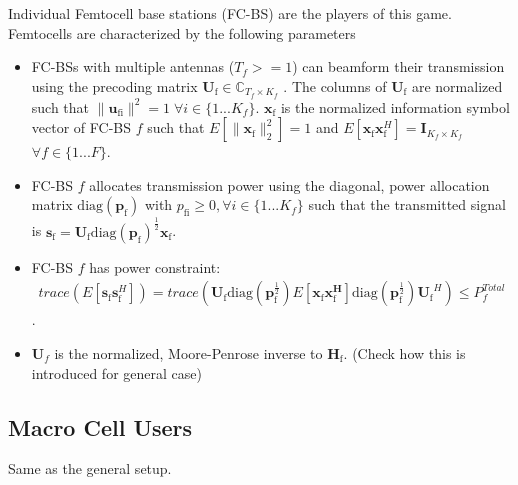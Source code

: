 \documentclass[12pt,a4paper]{report}
\begin{document}
Individual Femtocell base stations (FC-BS) are the players of this game.
\\
Femtocells are characterized by the following parameters
\begin{itemize}
\item 
	FC-BSs with multiple antennas ($T_f >=1$) can beamform their transmission using the precoding 	
	matrix $\mathbf{U}_{\mathrm{f}} \in \mathbb{C}_{T_f \times K_f}$ .
	The columns of $\mathbf{U}_{\mathrm{f}}$ are normalized such that 
	 $\|\mathbf{u}_{\mathrm{fi}}\|^2 =1 \;\forall i \in \{1 ... K_f\}$.
	 $\mathbf{x_{\mathrm{f}}}$ is the 		
	normalized information symbol vector of FC-BS $f$ such that $E[\|\mathbf{x}_{\mathrm{f}}
	\|_2^2]=1$ and $E[\mathbf{x}_{\mathrm{f}}\mathbf{x}_{\mathrm{f}}^H]=\mathbf{I}_{K_f \times K_f}$ $\forall f \in \{1 ... F\}$.
\\
\item  
	FC-BS $f$ allocates  transmission power using the diagonal, power allocation  	
	matrix $\mathrm{diag}(\mathbf{p}_{\mathrm{f}})$ with $p_{\mathrm{fi}} \geq 0, \forall i \in \{1 ... K_f\}$
such that the transmitted 		
	signal is 
	$\mathbf{s}_{\mathrm{f}	}= \mathbf{U_{\mathrm{f}}} 
	\mathrm{diag}(\mathbf{p}_{\mathrm{f}})^{\frac{1}{2}}
	\mathbf{x_{\mathrm{f}}}$.
\\
\item 
	FC-BS $f$ has power constraint:
	\begin{gather*}
	trace(E[\mathbf{s}_\mathrm{f}\mathbf{s}_\mathrm{f}^H]) =
	 trace(\mathbf{U_{\mathrm{f}}} 
	\mathrm{diag}(\mathbf{p}_{\mathrm{f}}^{\frac{1}{2}})
	E[\mathbf{x_{\mathrm{f}}}
	\mathbf{x_{\mathrm{f}}^H}]
	\mathrm{diag}(\mathbf{p}_{\mathrm{f}}^{\frac{1}{2}})
	\mathbf{U_{\mathrm{f}}}^H 
	)
	  \leq P^{Total}_{f} 
	  	\end{gather*}.


\item 
$\mathbf{U}_f$ is the normalized, Moore-Penrose inverse to $\mathbf{H_\mathrm{f}}$.
(Check how this is introduced for general case)
\end{itemize}

\subsection{Macro Cell Users}
Same as the general setup.
\end{document}
